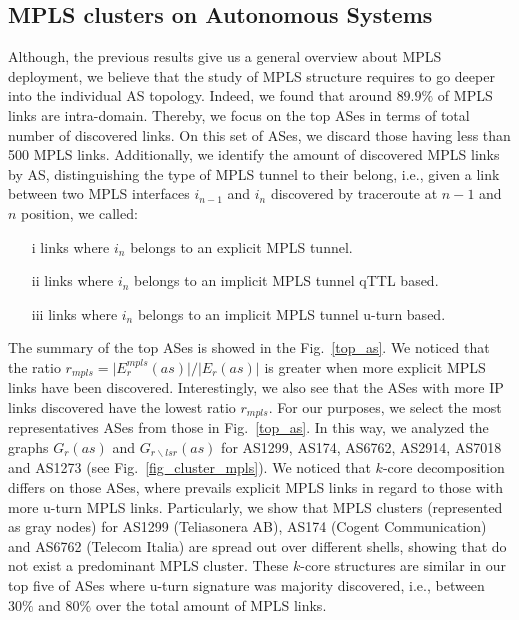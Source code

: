 \subsection{MPLS clusters on Autonomous Systems}\label{cluster.as}
Although, the previous results give us a general overview about MPLS deployment,
we believe that the study of MPLS structure requires to go deeper into the
individual AS topology. Indeed, we found that around $89.9\%$ of MPLS links are
intra-domain. Thereby, we focus on the top ASes in terms of total number of
discovered links.  On this set of ASes, we discard those having less than 500
MPLS links. Additionally, we identify the amount of discovered MPLS links by AS,
distinguishing the type of MPLS tunnel to their belong, i.e., given a link
between two MPLS interfaces $i_{n-1}$  and $i_{n}$ discovered by traceroute at
$n-1$ and $n$ position, we called:

\begin{itemize}
  \item[i]  links 
  where $i_{n}$ belongs  to an explicit MPLS tunnel.
  \item[ii]  links 
  where $i_{n}$ belongs  to an implicit MPLS tunnel qTTL based.
  \item[iii]  links 
  where $i_{n}$ belongs  to an implicit MPLS tunnel u-turn based.
\end{itemize}

The summary of the top ASes is showed in the Fig.~\ref{top_as}.
We noticed that the ratio $r_{mpls}= \vert E^{mpls}_{r} (as) \vert /\vert E_{r}
(as) \vert $  is greater when more explicit MPLS links have been discovered.
Interestingly, we also see that the ASes with more IP links discovered have the
lowest ratio $r_{mpls}$. For our purposes, we select the most representatives
ASes from those in Fig.~\ref{top_as}. In this way, we analyzed the graphs
$G_{r}(as)$ and $G_{r\backslash lsr}(as)$ for AS1299, AS174, AS6762, AS2914,
AS7018 and AS1273 (see Fig.~\ref{fig_cluster_mpls}). We noticed that $k$-core
decomposition differs on those ASes, where prevails explicit MPLS links in
regard to those with more u-turn MPLS links. Particularly, we show that MPLS
clusters (represented as gray nodes) for  AS1299 (Teliasonera AB), AS174 (Cogent
Communication) and AS6762 (Telecom Italia) are spread out over different shells,
showing that do not exist a predominant MPLS cluster. These $k$-core structures
are similar in our top five of ASes where u-turn signature was majority
discovered, i.e., between $30\%$ and  $80\%$ over  the total amount of MPLS
links.

